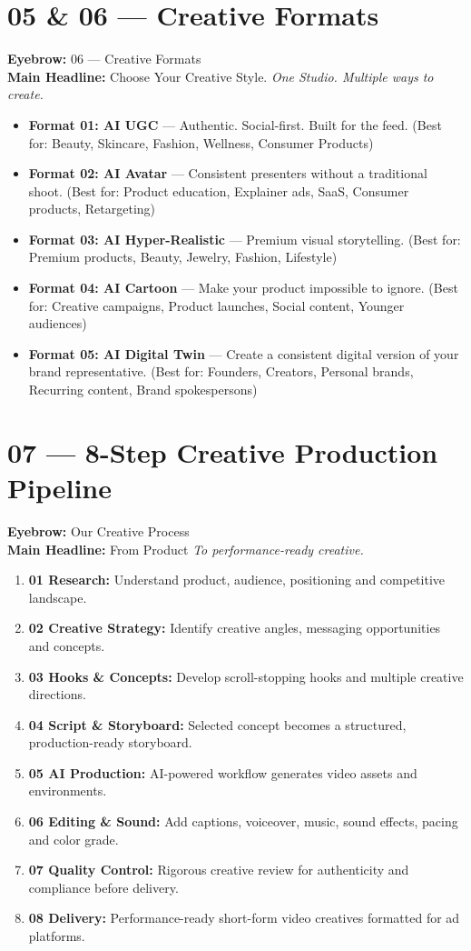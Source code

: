 \documentclass[11pt,a4paper]{article}
\begin{document}
\section{05 \& 06 --- Creative Formats}
\textbf{Eyebrow:} 06 — Creative Formats \\
\textbf{Main Headline:} Choose Your Creative Style. \textit{One Studio. Multiple ways to create.}

\begin{itemize}
    \item \textbf{Format 01: AI UGC} --- Authentic. Social-first. Built for the feed. (Best for: Beauty, Skincare, Fashion, Wellness, Consumer Products)
    \item \textbf{Format 02: AI Avatar} --- Consistent presenters without a traditional shoot. (Best for: Product education, Explainer ads, SaaS, Consumer products, Retargeting)
    \item \textbf{Format 03: AI Hyper-Realistic} --- Premium visual storytelling. (Best for: Premium products, Beauty, Jewelry, Fashion, Lifestyle)
    \item \textbf{Format 04: AI Cartoon} --- Make your product impossible to ignore. (Best for: Creative campaigns, Product launches, Social content, Younger audiences)
    \item \textbf{Format 05: AI Digital Twin} --- Create a consistent digital version of your brand representative. (Best for: Founders, Creators, Personal brands, Recurring content, Brand spokespersons)
\end{itemize}

\section{07 --- 8-Step Creative Production Pipeline}
\textbf{Eyebrow:} Our Creative Process \\
\textbf{Main Headline:} From Product \textit{To performance-ready creative.}
\begin{enumerate}[noitemsep]
    \item \textbf{01 Research:} Understand product, audience, positioning and competitive landscape.
    \item \textbf{02 Creative Strategy:} Identify creative angles, messaging opportunities and concepts.
    \item \textbf{03 Hooks \& Concepts:} Develop scroll-stopping hooks and multiple creative directions.
    \item \textbf{04 Script \& Storyboard:} Selected concept becomes a structured, production-ready storyboard.
    \item \textbf{05 AI Production:} AI-powered workflow generates video assets and environments.
    \item \textbf{06 Editing \& Sound:} Add captions, voiceover, music, sound effects, pacing and color grade.
    \item \textbf{07 Quality Control:} Rigorous creative review for authenticity and compliance before delivery.
    \item \textbf{08 Delivery:} Performance-ready short-form video creatives formatted for ad platforms.
\end{enumerate}
\end{document}
